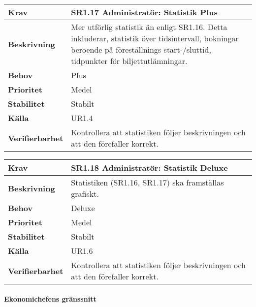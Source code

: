 \documentclass[a4paper, twoside, 11pt, titlepage]{article}
\begin{document}
			\begin {table} [ht] \begin{tabular} { p{2.6cm} p{12.5cm} }
				\hline
				\sffamily\textbf{Krav} & \sffamily\textbf{SR1.17 Administratör: Statistik Plus } \\
				\hline
				\sffamily\textbf{Beskrivning} & Mer utförlig statistik än enligt SR1.16. Detta inkluderar, statistik över tidsintervall, bokningar beroende på föreställnings start-/sluttid, tidpunkter för biljettutlämningar.  \\
				\hline
				\sffamily\textbf{Behov} & Plus  \\
				\hline
				\sffamily\textbf{Prioritet} & Medel  \\
				\hline
				\sffamily\textbf{Stabilitet} & Stabilt  \\
				\hline
				\sffamily\textbf{Källa} & UR1.4  \\
				\hline
				\sffamily\textbf{Verifierbarhet} & Kontrollera att statistiken följer beskrivningen och att den förefaller korrekt.  \\
				\hline
			\end{tabular} \end{table} \FloatBarrier
			\vspace{6mm}

			\begin {table} [ht] \begin{tabular} { p{2.6cm} p{12.5cm} }
				\hline
				\sffamily\textbf{Krav} & \sffamily\textbf{SR1.18 Administratör: Statistik Deluxe } \\
				\hline
				\sffamily\textbf{Beskrivning} & Statistiken (SR1.16, SR1.17) ska framställas grafiskt.  \\
				\hline
				\sffamily\textbf{Behov} & Deluxe  \\
				\hline
				\sffamily\textbf{Prioritet} & Medel  \\
				\hline
				\sffamily\textbf{Stabilitet} & Stabilt  \\
				\hline
				\sffamily\textbf{Källa} & UR1.6  \\
				\hline
				\sffamily\textbf{Verifierbarhet} & Kontrollera att statistiken följer beskrivningen och att den förefaller korrekt.  \\
				\hline
			\end{tabular} \end{table} \FloatBarrier


			\paragraph{Ekonomichefens gränssnitt}\
\end{document}

